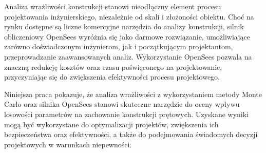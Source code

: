 Analiza wrażliwości konstrukcji stanowi nieodłączny element procesu projektowania inżynierskiego, niezależnie od skali i złożoności obiektu.
Choć na rynku dostępne są liczne komercyjne narzędzia do analizy konstrukcji, silnik obliczeniowy OpenSees wyróżnia się jako darmowe rozwiązanie, umożliwiające zarówno doświadczonym inżynierom, jak i początkującym projektantom, przeprowadzanie zaawansowanych analiz.
Wykorzystanie OpenSees pozwala na znaczną redukcję kosztów oraz czasu poświęconego na projektowanie, przyczyniając się do zwiększenia efektywności procesu projektowego.

Niniejsza praca pokazuje, że analiza wrażliwości z wykorzystaniem metody Monte Carlo oraz silnika OpenSees stanowi skuteczne narzędzie do oceny wpływu losowości parametrów na zachowanie konstrukcji prętowych.
Uzyskane wyniki mogą być wykorzystane do optymalizacji projektów, zwiększenia ich bezpieczeństwa oraz efektywności, a także do podejmowania świadomych decyzji projektowych w warunkach niepewności.
